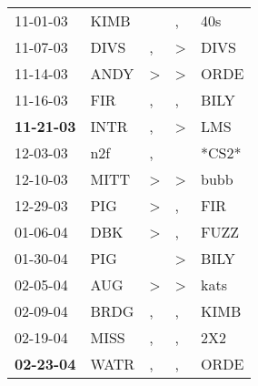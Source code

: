 \begin{supertabular}{p{0.07\textwidth}p{0.06\textwidth}p{0.02\textwidth}p{0.02\textwidth}p{0.06\textwidth}}
          11-01-03\textsuperscript{} &           KIMB\textsuperscript{} &                  &                , &            40s\textsuperscript{} \\
          11-07-03\textsuperscript{} &           DIVS\textsuperscript{} &                , &     \textgreater &           DIVS\textsuperscript{} \\
          11-14-03\textsuperscript{} &           ANDY\textsuperscript{} &     \textgreater &     \textgreater &           ORDE\textsuperscript{} \\
          11-16-03\textsuperscript{} &            FIR\textsuperscript{} &                , &                , &           BILY\textsuperscript{} \\
 \textbf{11-21-03\textsuperscript{}} &           INTR\textsuperscript{} &                , &     \textgreater &            LMS\textsuperscript{} \\
          12-03-03\textsuperscript{} &            n2f\textsuperscript{} &                , &                  &                            *CS2* \\
          12-10-03\textsuperscript{} &           MITT\textsuperscript{} &     \textgreater &     \textgreater &           bubb\textsuperscript{} \\
          12-29-03\textsuperscript{} &            PIG\textsuperscript{} &     \textgreater &                , &            FIR\textsuperscript{} \\
          01-06-04\textsuperscript{} &            DBK\textsuperscript{} &     \textgreater &                , &           FUZZ\textsuperscript{} \\
          01-30-04\textsuperscript{} &            PIG\textsuperscript{} &                  &     \textgreater &           BILY\textsuperscript{} \\
          02-05-04\textsuperscript{} &            AUG\textsuperscript{} &     \textgreater &     \textgreater &           kats\textsuperscript{} \\
          02-09-04\textsuperscript{} &           BRDG\textsuperscript{} &                , &                , &           KIMB\textsuperscript{} \\
          02-19-04\textsuperscript{} &           MISS\textsuperscript{} &                , &                , &            2X2\textsuperscript{} \\
 \textbf{02-23-04\textsuperscript{}} &           WATR\textsuperscript{} &                , &                , &           ORDE\textsuperscript{} \\

\end{supertabular}
